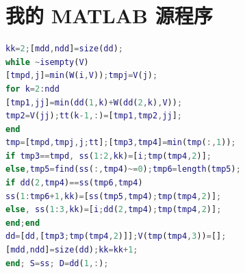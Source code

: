 \documentclass[bwprint]{gmcmthesis}
\begin{document}
\section{我的 MATLAB 源程序}
\begin{lstlisting}[language=Matlab]%设置不同语言即可。
kk=2;[mdd,ndd]=size(dd);
while ~isempty(V)
[tmpd,j]=min(W(i,V));tmpj=V(j);
for k=2:ndd
[tmp1,jj]=min(dd(1,k)+W(dd(2,k),V));
tmp2=V(jj);tt(k-1,:)=[tmp1,tmp2,jj];
end
tmp=[tmpd,tmpj,j;tt];[tmp3,tmp4]=min(tmp(:,1));
if tmp3==tmpd, ss(1:2,kk)=[i;tmp(tmp4,2)];
else,tmp5=find(ss(:,tmp4)~=0);tmp6=length(tmp5);
if dd(2,tmp4)==ss(tmp6,tmp4)
ss(1:tmp6+1,kk)=[ss(tmp5,tmp4);tmp(tmp4,2)];
else, ss(1:3,kk)=[i;dd(2,tmp4);tmp(tmp4,2)];
end;end
dd=[dd,[tmp3;tmp(tmp4,2)]];V(tmp(tmp4,3))=[];
[mdd,ndd]=size(dd);kk=kk+1;
end; S=ss; D=dd(1,:);


 \end{lstlisting}
\end{document}
